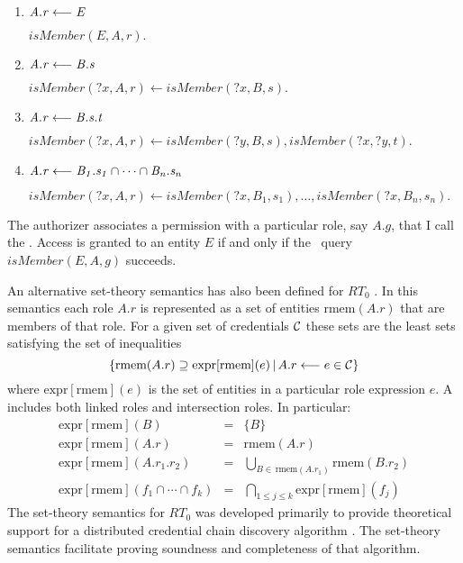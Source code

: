 \begin{enumerate}

\item $\mathit{A.r} \stackrel{}{\longleftarrow} \mathit{E}$

$\textit{isMember}(E, A, r).$

\item $\mathit{A.r} \stackrel{}{\longleftarrow} \mathit{B.s}$

$\textit{isMember}(\textit{?x}, A, r) \leftarrow
 \textit{isMember}(\textit{?x}, B, s).$

\item $\mathit{A.r} \stackrel{}{\longleftarrow} \mathit{B.s.t}$

$\textit{isMember}(\textit{?x}, A, r) \leftarrow
 \textit{isMember}(\textit{?y}, B, s),
 \textit{isMember}(\textit{?x}, \textit{?y}, t).$

\item $\mathit{A.r} \stackrel{}{\longleftarrow} \mathit{B_1.s_1 \cap \cdots \cap B_n.s_n}$

$\textit{isMember}(\textit{?x}, A, r) \leftarrow
 \textit{isMember}(\textit{?x}, B_1, s_1), \ldots,
 \textit{isMember}(\textit{?x}, B_n, s_n).$

\end{enumerate}

The authorizer associates a permission with a particular role, say $A.g$, that I call the
. Access is granted to an entity $E$ if and only if the \datalog\ query
$\textit{isMember}(E, A, g)$ succeeds.

An alternative set-theory semantics has also been defined for $RT_0$ \cite{Li:DCDTM}. In this
semantics each role $A.r$ is represented as a set of entities $\mbox{rmem}(A.r)$ that are
members of that role. For a given set of credentials $\mathcal{C}$ these sets are the least sets
satisfying the set of inequalities
\begin{displaymath}
\{ \mbox{rmem}(A.r) \supseteq \mbox{expr}[\mbox{rmem}](e)\,|\,
   A.r \longleftarrow e \in \mathcal{C} \}
\end{displaymath}
where $\mbox{expr}[\mbox{rmem}](e)$ is the set of entities in a particular role expression $e$.
A  includes both linked roles and intersection roles. In particular:
\begin{eqnarray*}
\mbox{expr}[\mbox{rmem}](B)        & = & \{B\}            \\
\mbox{expr}[\mbox{rmem}](A.r)      & = & \mbox{rmem}(A.r) \\
\mbox{expr}[\mbox{rmem}](A.r_1.r_2) & = &
  \bigcup_{B \in\, \mbox{rmem}(A.r_1)} \mbox{rmem}(B.r_2) \\
\mbox{expr}[\mbox{rmem}](f_1 \cap \cdots \cap f_k) & = &
  \bigcap_{1 \le j \le k} \mbox{expr}[\mbox{rmem}](f_j)
\end{eqnarray*}
The set-theory semantics for $RT_0$ was developed primarily to provide theoretical support for
a distributed credential chain discovery algorithm \cite{Li:DCDTM}. The set-theory semantics
facilitate proving soundness and completeness of that algorithm.

